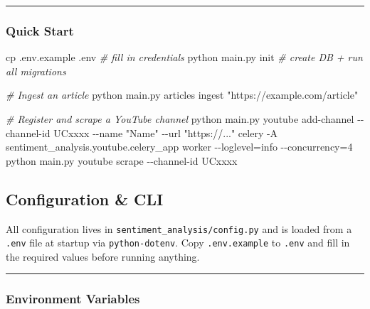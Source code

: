 \documentclass[
]{article}
\newenvironment{Shaded}{}{}
\newcommand{\AttributeTok}[1]{\textcolor[rgb]{0.49,0.56,0.16}{#1}}
\newcommand{\CommentTok}[1]{\textcolor[rgb]{0.38,0.63,0.69}{\textit{#1}}}
\newcommand{\ExtensionTok}[1]{#1}
\newcommand{\FunctionTok}[1]{\textcolor[rgb]{0.02,0.16,0.49}{#1}}
\newcommand{\NormalTok}[1]{#1}
\newcommand{\OperatorTok}[1]{\textcolor[rgb]{0.40,0.40,0.40}{#1}}
\newcommand{\StringTok}[1]{\textcolor[rgb]{0.25,0.44,0.63}{#1}}
\begin{document}
\begin{center}\rule{0.5\linewidth}{0.5pt}\end{center}

\subsubsection{Quick Start}\label{quick-start}

\begin{Shaded}
\begin{Highlighting}[]
\FunctionTok{cp}\NormalTok{ .env.example .env          }\CommentTok{\# fill in credentials}
\ExtensionTok{python}\NormalTok{ main.py init           }\CommentTok{\# create DB + run all migrations}

\CommentTok{\# Ingest an article}
\ExtensionTok{python}\NormalTok{ main.py articles ingest }\StringTok{"https://example.com/article"}

\CommentTok{\# Register and scrape a YouTube channel}
\ExtensionTok{python}\NormalTok{ main.py youtube add{-}channel }\AttributeTok{{-}{-}channel{-}id}\NormalTok{ UCxxxx }\AttributeTok{{-}{-}name} \StringTok{"Name"} \AttributeTok{{-}{-}url} \StringTok{"https://..."}
\ExtensionTok{celery} \AttributeTok{{-}A}\NormalTok{ sentiment\_analysis.youtube.celery\_app worker }\AttributeTok{{-}{-}loglevel}\OperatorTok{=}\NormalTok{info }\AttributeTok{{-}{-}concurrency}\OperatorTok{=}\NormalTok{4}
\ExtensionTok{python}\NormalTok{ main.py youtube scrape }\AttributeTok{{-}{-}channel{-}id}\NormalTok{ UCxxxx}
\end{Highlighting}
\end{Shaded}

\label{file-configuration-cli}
\subsection{Configuration \& CLI}\label{configuration--cli}

All configuration lives in \texttt{sentiment\_analysis/config.py} and is
loaded from a \texttt{.env} file at startup via \texttt{python-dotenv}.
Copy \texttt{.env.example} to \texttt{.env} and fill in the required
values before running anything.

\begin{center}\rule{0.5\linewidth}{0.5pt}\end{center}

\subsubsection{Environment Variables}\label{environment-variables}
\end{document}
